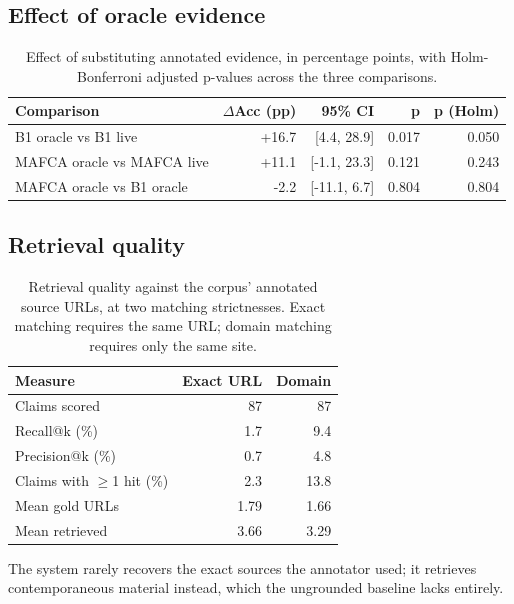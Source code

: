 \documentclass[11pt,a4paper]{article}
\begin{document}
\subsection{Effect of oracle evidence}
\begin{table}[H]
\centering
\small
\caption{Effect of substituting annotated evidence, in percentage points, with Holm-Bonferroni adjusted p-values across the three comparisons.}
\label{tab:oracle_gain}
\begin{tabular}{@{}lrrrr@{}}
\toprule
\textbf{Comparison} & \textbf{$\Delta$Acc (pp)} & \textbf{95\% CI} & \textbf{p} & \textbf{p (Holm)} \\
\midrule
B1 oracle vs B1 live & +16.7 & [4.4, 28.9] & 0.017 & 0.050 \\
MAFCA oracle vs MAFCA live & +11.1 & [-1.1, 23.3] & 0.121 & 0.243 \\
MAFCA oracle vs B1 oracle & -2.2 & [-11.1, 6.7] & 0.804 & 0.804 \\
\bottomrule
\end{tabular}
\end{table}
\subsection{Retrieval quality}
\begin{table}[H]
\centering
\small
\caption{Retrieval quality against the corpus' annotated source URLs, at two matching strictnesses. Exact matching requires the same URL; domain matching requires only the same site.}
\label{tab:retrieval}
\begin{tabular}{@{}lrr@{}}
\toprule
\textbf{Measure} & \textbf{Exact URL} & \textbf{Domain} \\
\midrule
Claims scored & 87 & 87 \\
Recall@k (\%) & 1.7 & 9.4 \\
Precision@k (\%) & 0.7 & 4.8 \\
Claims with $\geq$1 hit (\%) & 2.3 & 13.8 \\
Mean gold URLs & 1.79 & 1.66 \\
Mean retrieved & 3.66 & 3.29 \\
\bottomrule
\end{tabular}
\par\vspace{2pt}\footnotesize{The system rarely recovers the exact sources the annotator used; it retrieves contemporaneous material instead, which the ungrounded baseline lacks entirely.}
\end{table}
\end{document}

